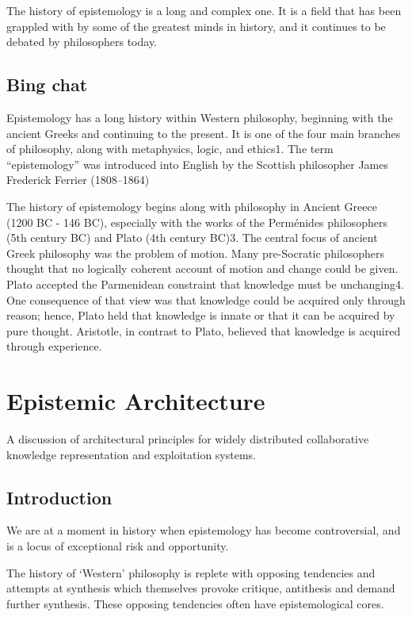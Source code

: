 \documentclass[10pt,titlepage]{book}
\begin{document}
The history of epistemology is a long and complex one. It is a field that has been grappled with by some of the greatest minds in history, and it continues to be debated by philosophers today.

\section{Bing chat}

Epistemology has a long history within Western philosophy, beginning with the ancient Greeks and continuing to the present. It is one of the four main branches of philosophy, along with metaphysics, logic, and ethics1. The term “epistemology” was introduced into English by the Scottish philosopher James Frederick Ferrier (1808–1864)

The history of epistemology begins along with philosophy in Ancient Greece (1200 BC - 146 BC), especially with the works of the Perménides philosophers (5th century BC) and Plato (4th century BC)3. The central focus of ancient Greek philosophy was the problem of motion. Many pre-Socratic philosophers thought that no logically coherent account of motion and change could be given. Plato accepted the Parmenidean constraint that knowledge must be unchanging4. One consequence of that view was that knowledge could be acquired only through reason; hence, Plato held that knowledge is innate or that it can be acquired by pure thought.
Aristotle, in contrast to Plato, believed that knowledge is acquired through experience.

\chapter{Epistemic Architecture}

A discussion of architectural principles for widely distributed collaborative knowledge representation and exploitation systems.


\section{Introduction}

We are at a moment in history when epistemology has become controversial, and is a locus of exceptional risk and opportunity.

The history of `Western' philosophy is replete with opposing tendencies and attempts at synthesis which themselves provoke critique, antithesis and demand further synthesis.
These opposing tendencies often have epistemological cores.
\end{document}

